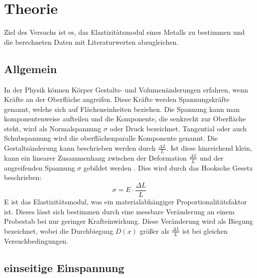 \section{Theorie}
\label{sec:Theorie}

Ziel des Versuchs ist es, das Elastizitätsmodul eines Metalls zu bestimmen und die berechneten Daten mit Literaturwerten abzugleichen.


\subsection{Allgemein}
In der Physik können Körper Gestalts- und Volumenänderungen erfahren, wenn Kräfte an der Oberfläche angreifen. Diese Kräfte werden Spannungskräfte genannt, welche sich auf Flächeneinheiten beziehen.
Die Spannung kann man komponentenweise aufteilen und die Komponente, die senkrecht zur Oberfläche steht, wird als Normalspannung $\sigma$ oder Druck bezeichnet.
Tangential oder auch Schubspannung wird die oberflächenparalle Komponente genannt.
Die Gestaltsänderung kann beschrieben werden durch $\frac{\Delta L}{L}$. 
Ist diese hinreichend klein, kann ein linearer Zusammenhang zwischen der Deformation $\frac{\Delta L}{L}$ und der angreifenden Spannung $\sigma$ gebildet werden \cite[106]{V103}.  Dies wird durch das Hooksche Gesetz beschrieben:
\begin{equation}
  \sigma = E \cdot \frac{\Delta L}{L}
  \label{eqn:Hook}
\end{equation}
E ist das Elastizitätsmodul, was ein materialabhängiger Proportionalitätsfaktor ist.
Dieses lässt sich bestimmen durch eine messbare Veränderung an einem Probestab bei nur geringer Krafteinwirkung. 
Diese Veränderung wird als Biegung bezeichnet, wobei die Durchbiegung $D(x)$ größer als $\frac{\Delta L}{L}$ ist bei gleichen Versuchbedingungen.


\subsection{einseitige Einspannung}

